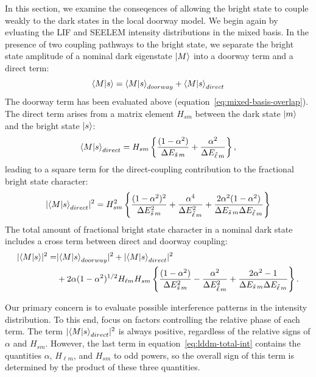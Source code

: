 \documentclass[12pt]{mitthesis}
\newcommand{\ts}{\tilde{s}\,}
\newcommand{\tl}{\tilde{\ell}\,}
\begin{document}
In this section, we examine the conseqences of allowing the bright
state to couple weakly to the dark states in the local doorway model.
We begin again by evluating the LIF and SEELEM intensity distributions
in the mixed basis. In the presence of two coupling pathways to the
bright state, we separate the bright state amplitude of a nominal dark
eigenstate $\mathinner{|{M}\rangle}$ into a doorway term and a direct term:
\begin{equation}
\mathinner{\langle{M|s}\rangle} = \mathinner{\langle{M|s}\rangle}_{doorway} + \mathinner{\langle{M|s}\rangle}_{direct}
\end{equation}
The doorway term has been evaluated above
(equation~\ref{eq:mixed-basis-overlap}).  The direct term arises from
a matrix element $H_{sm}$ between the dark state $\mathinner{|{m}\rangle}$ and the
bright state $\mathinner{|{s}\rangle}$:
\begin{equation}
\braket{M|s}_{direct} = H_{sm} 
\left \lbrace 
  \frac{(1 - \alpha^2)}{\Delta E_{\ts m}} + 
  \frac{\alpha^2}{\Delta E_{\tl m}}
\right \rbrace,
\end{equation}
leading to a square term for the direct-coupling contribution to the
fractional bright state character:
\begin{equation}
  \label{eq:lddm-direct-int}
  \lvert \braket{M|s}_{direct} \rvert^2 = H_{sm}^2
  \left \lbrace
    \frac{(1 - \alpha^2)^2}{\Delta E_{\ts m}^2} +
    \frac{\alpha^4}{\Delta E_{\tl m}^2} +
    \frac{2 \alpha^2 (1 - \alpha^2)}
         {\Delta E_{\ts m} \Delta E_{\tl m}}
  \right \rbrace
\end{equation}
The total amount of fractional bright state character in a nominal
dark state includes a cross term between direct and doorway coupling:
\begin{equation}
  \label{eq:lddm-total-int}
  \begin{split}
    \lvert \braket{M|s} \rvert^2 =&
    \lvert \braket{M|s}_{doorway} \rvert^2 + 
    \lvert \braket{M|s}_{direct} \rvert^2 \\
    & + 2 \alpha (1-\alpha^2)^{1/2} H_{\ell m} H_{s m}
    \left \lbrace
      \frac{(1-\alpha^2)}{\Delta E_{\ts m}^2}
      - \frac{\alpha^2}{\Delta E_{\tl m}^2}
      + \frac{2\alpha^2 -1}{\Delta E_{\ts m} \Delta E_{\tl m}}
    \right \rbrace.\\
  \end{split}
\end{equation}

Our primary concern is to evaluate possible interference patterns in
the intensity distribution.  To this end, focus on factors controlling
the relative phase of each term.  The term $\lvert
\mathinner{\langle{M|s}\rangle}_{direct} \rvert^2$ is always positive, regardless of the
relative signs of $\alpha$ and $H_{sm}$.  However, the last term in
equation~\ref{eq:lddm-total-int} contains the quantities $\alpha$,
$H_{\ell m}$, and $H_{sm}$ to odd powers, so the overall sign of this
term is determined by the product of these three quantities.
\end{document}
